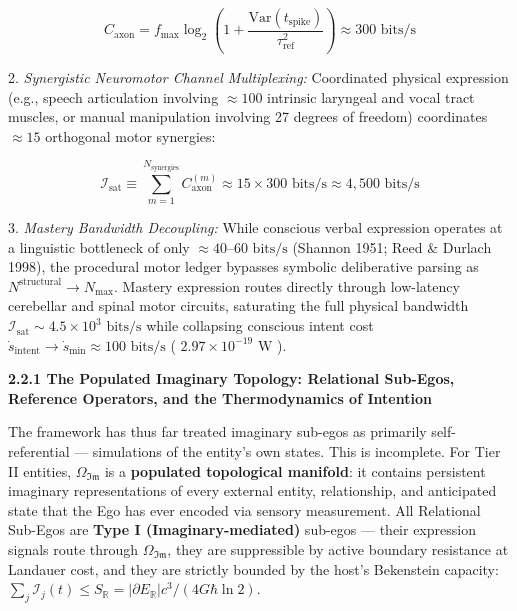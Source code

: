 \documentclass[11pt,a4paper]{article}
\theoremstyle{definition}
\theoremstyle{remark}
\begin{document}
\begin{equation}
C_{\text{axon}} = f_{\max} \log_2\left(1 + \frac{\text{Var}(t_{\text{spike}})}{\tau_{\text{ref}}^2}\right) \approx 300\text{ bits/s}
\end{equation}


2. \textit{Synergistic Neuromotor Channel Multiplexing:} Coordinated physical expression (e.g., speech articulation involving $\approx 100$ intrinsic laryngeal and vocal tract muscles, or manual manipulation involving 27 degrees of freedom) coordinates $\approx 15$ orthogonal motor synergies:


\begin{equation}
\boxed{\mathcal{I}_{\text{sat}} \equiv \sum_{m=1}^{N_{\text{synergies}}} C_{\text{axon}}^{(m)} \approx 15 \times 300\text{ bits/s} \approx 4{,}500\text{ bits/s}}
\end{equation}


3. \textit{Mastery Bandwidth Decoupling:} While conscious verbal expression operates at a linguistic bottleneck of only $\approx 40\text{--}60\text{ bits/s}$ (Shannon 1951; Reed \& Durlach 1998), the procedural motor ledger bypasses symbolic deliberative parsing as $N^{\text{structural}} \to N_{\max}$. Mastery expression routes directly through low-latency cerebellar and spinal motor circuits, saturating the full physical bandwidth $\mathcal{I}_{\text{sat}} \sim 4.5 \times 10^3\text{ bits/s}$ while collapsing conscious intent cost $\dot{s}_{\text{intent}} \to \dot{s}_{\min} \approx 100\text{ bits/s}$ ( $2.97 \times 10^{-19}\text{ W}$ ).

\textbf{2.2.1 The Populated Imaginary Topology: Relational Sub-Egos, Reference Operators, and the Thermodynamics of Intention}

The framework has thus far treated imaginary sub-egos as primarily self-referential — simulations of the entity's own states. This is incomplete. For Tier II entities, $\Omega_{\mathfrak{Im}}$ is a \textbf{populated topological manifold}: it contains persistent imaginary representations of every external entity, relationship, and anticipated state that the Ego has ever encoded via sensory measurement. All Relational Sub-Egos are \textbf{Type I (Imaginary-mediated)} sub-egos — their expression signals route through $\Omega_{\mathfrak{Im}}$, they are suppressible by active boundary resistance at Landauer cost, and they are strictly bounded by the host's Bekenstein capacity: $\sum_j \mathcal{I}_j(t) \leq S_{\mathbb{R}} = |\partial E_{\mathbb{R}}| c^3 / (4G\hbar \ln 2)$.
\end{document}

